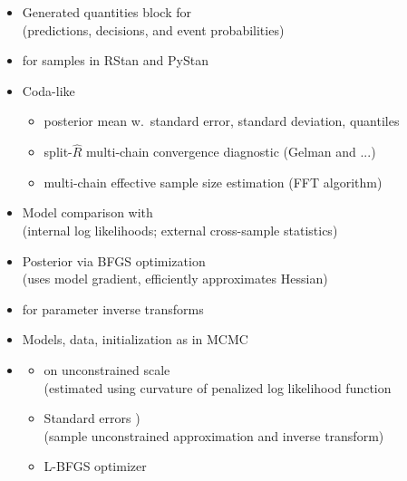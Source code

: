 \documentclass[10pt]{report}
\newcommand{\sld}[1]{\newpage{\noindent\LARGE \ \ \
    \textcolor{MidnightBlue}{\bfseries #1}}\vspace*{4pt}}
\newcommand{\myemph}[1]{{\color{MidnightBlue}{\bfseries #1}}}
\begin{document}
\sld{Posterior Inference}

\begin{itemize}
\item Generated quantities block for \myemph{inference}
\\ {\footnotesize (predictions, decisions, and event probabilities)}
\item \myemph{Extractors} for samples in RStan and PyStan
\item Coda-like \myemph{posterior summary}
\vspace*{-4pt}
\begin{itemize}\small
\item posterior mean w.\ standard error, standard deviation, quantiles
\item split-$\hat{R}$ multi-chain convergence diagnostic (Gelman and ...)
\item multi-chain effective sample size estimation (FFT algorithm)
\end{itemize}
\item Model comparison with \myemph{WAIC}
\\
{\footnotesize (internal log likelihoods; external cross-sample statistics)}
\end{itemize}

\sld{Penalized MLE}

\begin{itemize}
\item Posterior \myemph{mode finding} via BFGS optimization
\\ {\footnotesize (uses model gradient, efficiently approximates Hessian)}
\item \myemph{Disables Jacobians} for parameter inverse transforms
\item Models, data, initialization as in MCMC
\vfill
\item \myemph{Very Near Future}
\vspace*{-4pt}
\begin{itemize}\small
\item  \myemph{Standard errors} on unconstrained scale
\\
{\footnotesize  (estimated using curvature of penalized log likelihood function}
\item Standard errors \myemph{on constrained scale})
\\
{\footnotesize  (sample unconstrained approximation and inverse transform)}
\item L-BFGS optimizer
\end{itemize}      
\end{itemize}
\end{document}
